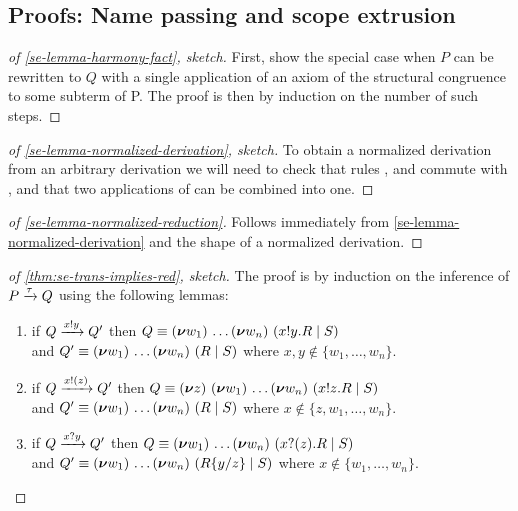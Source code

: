 \subsection{Proofs: Name passing and scope extrusion}
\begin{proof}[of \cref{se-lemma-harmony-fact}, sketch]
  First, show the special case when \( P \) can be rewritten to \( Q \) with a single application of an axiom of the structural congruence to some subterm of P.
  The proof is then by induction on the number of such steps.
\end{proof}

\begin{proof}[of \cref{se-lemma-normalized-derivation}, sketch]
  To obtain a normalized derivation from an arbitrary derivation we will need to check that rules ,  and  commute with , and that two applications of  can be combined into one.
\end{proof}

\begin{proof}[of \cref{se-lemma-normalized-reduction}]
  Follows immediately from \cref{se-lemma-normalized-derivation} and the shape of a normalized derivation.
\end{proof}

\begin{proof}[of \cref{thm:se-trans-implies-red}, sketch]
  The proof is by induction on the inference of\\\( P \xrightarrow{\tau} Q \) using the following lemmas:
  \begin{enumerate}
  \item if \( Q \xrightarrow{x ! y} Q' \) then \( Q \equiv (\bm{\nu} w_1)~\!\dots (\bm{\nu} w_n)~(x ! y . R \mid S) \)\\and \( Q' \equiv (\bm{\nu} w_1)~\!\dots (\bm{\nu} w_n)~(R \mid S) \) where \( x,y \notin \{ w_1, \dots, w_n \} \).
  \item if \( Q \xrightarrow{x ! (z)} Q' \) then \( Q \equiv (\bm{\nu} z)~(\bm{\nu} w_1)~\!\dots (\bm{\nu} w_n)~(x ! z . R \mid S) \)\\and \( Q' \equiv (\bm{\nu} w_1)~\!\dots (\bm{\nu} w_n)~(R \mid S) \) where \( x \notin \{ z, w_1, \dots, w_n \} \).
  \item if \( Q \xrightarrow{x ? y} Q' \) then \( Q \equiv (\bm{\nu} w_1)~\!\dots (\bm{\nu} w_n)~(x ? (z) . R \mid S) \)\\and \( Q' \equiv (\bm{\nu} w_1)~\!\dots (\bm{\nu} w_n)~(R\{y/z\} \mid S) \) where \( x \notin \{ w_1, \dots, w_n \} \).
  \end{enumerate}
\end{proof}

